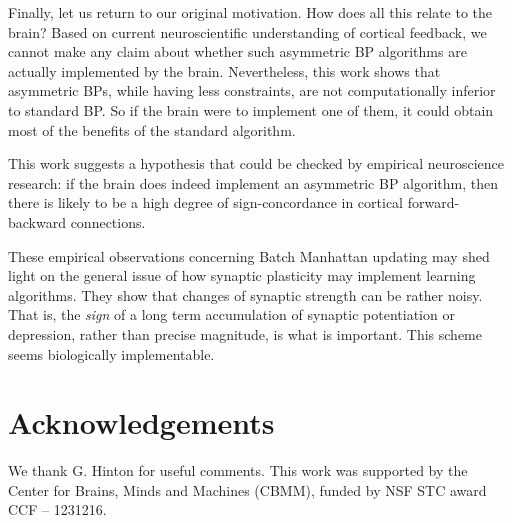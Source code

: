 \documentclass[letterpaper]{article}
\begin{document}
Finally, let us return to our original motivation. How does all this relate to the brain? Based on current neuroscientific understanding of cortical feedback, we cannot make any claim about whether such asymmetric BP algorithms are actually implemented by the brain. Nevertheless, this work shows that asymmetric BPs, while having less constraints, are not computationally inferior to standard BP. So if the brain were to implement one of them, it could obtain most of the benefits of the standard algorithm. 

This work suggests a hypothesis that could be checked by empirical neuroscience research: if the brain does indeed implement an asymmetric BP algorithm, then there is likely to be a high degree of sign-concordance in cortical forward-backward connections.

These empirical observations concerning Batch Manhattan updating may shed light on the general issue of how synaptic plasticity may implement learning algorithms. They show that changes of synaptic strength can be rather noisy. That is, the \textit{sign} of a long term accumulation of synaptic potentiation or depression, rather than precise magnitude, is what is important. This scheme seems biologically implementable.

\section{Acknowledgements}
We thank G. Hinton for useful comments. This work was supported  by the Center for Brains, Minds and Machines (CBMM), funded by NSF STC award  CCF – 1231216.
\end{document}
